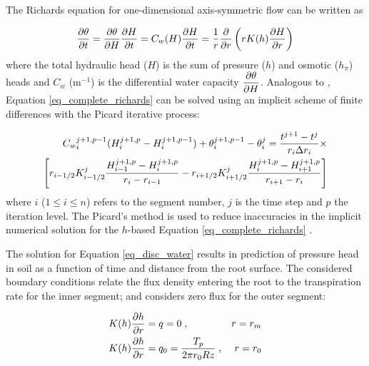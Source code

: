 The Richards equation for one-dimensional axis-symmetric flow can be written as

\begin{equation}
\label{eq_complete_richards}
{\partial \theta \over \partial t} = {\partial \theta \over \partial H} {\partial H \over \partial t} = C_w(H) {\partial H \over \partial t} = {1 \over r}{\partial \over \partial r} \left( r K(h) {\partial H \over \partial r} \right)
\end{equation}
%
where the total hydraulic head ($H$) is the sum of pressure ($h$) and osmotic ($h_\pi$) heads and $C_w$ (m$^{-1}$) is the differential water capacity $\displaystyle{\partial\theta \over \partial H}$.
Analogous to \cite{vandam_feddes}, Equation \ref{eq_complete_richards} can be solved using an implicit scheme of finite differences with the Picard iterative process:

\begin{equation}
\label{eq_disc_water}
\begin{split}
  {C_w}_i^{j+1,p-1} (H_i^{j+1,p} - H_i^{j+1,p-1}) + \theta_i^{j+1,p-1}-\theta_i^j = {t^{j+1}-t^j \over r_i \Delta r_i} \times \\
  \left[  
  r_{i-1/2}K_{i-1/2}^j {H_{i-1}^{j+1,p}-H_i^{j+1,p} \over r_i-r_{i-1}}
  -
  r_{i+1/2}K_{i+1/2}^j {H_{i}^{j+1,p}-H_{i+1}^{j+1,p} \over r_{i+1}-r_{i}}
  \right]
\end{split}
\end{equation}
%
where $i$ ($1 \leq i \leq n$) refers to the segment number, $j$ is the time step and $p$ the iteration level. 
The Picard's method is used to reduce inaccuracies in the implicit numerical solution for the $h$-based Equation \ref{eq_complete_richards} \citep{celia}.

The solution for Equation \ref{eq_disc_water} results in prediction of pressure head in soil as a function of time and distance from the root surface. 
The considered boundary conditions relate the flux density entering the root to the transpiration rate for the inner segment; and considers zero flux for the outer segment:

\begin{linenomath}
\begin{align}
  \label{eq_bcw1}
  K(h) {\partial h \over \partial r} &= q = 0\;{\rm ,} &r=r_m \\
  \label{eq_bcw2}
  K(h) \frac{\partial h}{\partial r} &= q_0 = \frac{T_p}{2 \pi r_0 R z}\;{\rm ,} &r=r_0   
\end{align}
\end{linenomath}

